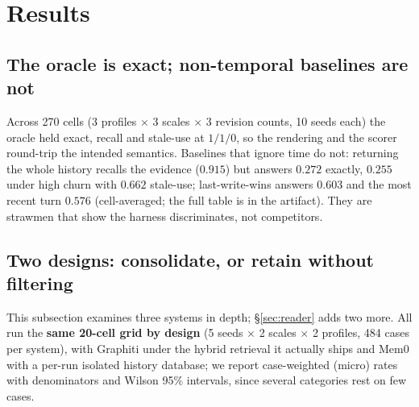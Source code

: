 \documentclass[conference]{IEEEtran}
\begin{document}
\section{Results}\label{sec:results}

\subsection{The oracle is exact; non-temporal baselines are not}

Across 270 cells (3 profiles $\times$ 3 scales $\times$ 3 revision counts, 10 seeds
each) the oracle held exact, recall and stale-use at $1/1/0$, so the rendering
and the scorer round-trip the intended semantics. Baselines that ignore time do
not: returning the whole history recalls the evidence ($0.915$) but answers
$0.272$ exactly, $0.255$ under high churn with $0.662$ stale-use;
last-write-wins answers $0.603$ and the most recent turn $0.576$
(cell-averaged; the full table is in the artifact). They are strawmen that show
the harness discriminates, not competitors.

\subsection{Two designs: consolidate, or retain without filtering}

This subsection examines three systems in depth; \S\ref{sec:reader} adds two
more. All run the \textbf{same 20-cell grid by design} (5 seeds $\times$ 2
scales $\times$ 2 profiles, 484 cases per system), with Graphiti under the hybrid
retrieval it actually ships and Mem0 with a per-run isolated history database; we report case-weighted
(micro) rates with denominators and Wilson 95\% intervals, since several
categories rest on few cases.
\end{document}
